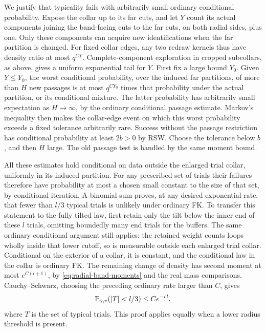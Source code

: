 We justify that typicality fails with arbitrarily small ordinary
conditional probability. Expose the collar up to its far cuts, and
let $Y$ count its actual components joining the band-facing cuts to
the far cuts, on both radial sides, plus one. Only these components
can acquire new identifications when the far partition is changed.
For fixed collar edges, any two redraw kernels thus have density
ratio at most $q^{C Y}$. Complete-component exploration in cropped
subcollars, as above, gives a uniform exponential tail for $Y$.
First fix a large bound $Y_0$. Given $Y\le Y_0$, the worst conditional
probability, over the induced far partitions, of more than $H$ new
passages is at most $q^{CY_0}$ times that probability under the
actual partition, or its conditional mixture. The latter probability
has arbitrarily small expectation as $H\to\infty$, by the ordinary
conditional passage estimate. Markov's inequality then makes the
collar-edge event on which this worst probability exceeds a fixed
tolerance arbitrarily rare. Success without the passage restriction
has conditional probability at least $2b>0$ by RSW. Choose the
tolerance below $b$, and then $H$ large. The old passage test is
handled by the same moment bound.

All these estimates hold conditional on data outside the enlarged
trial collar, uniformly in its induced partition. For any prescribed
set of trials their failures therefore have probability at most a
chosen small constant to the size of that set, by conditional
iteration. A binomial sum proves, at any desired exponential rate,
that fewer than $l/3$ typical trials is unlikely under ordinary FK.
To transfer this statement to the fully tilted law, first retain
only the tilt below the inner end of these $l$ trials, omitting
boundedly many end trials for the buffers. The same ordinary
conditional argument still applies: the retained weight counts
loops wholly inside that lower cutoff, so is measurable outside
each enlarged trial collar. Conditional on the exterior of a collar,
it is constant, and the conditional law in the collar is ordinary
FK. The remaining change of density
has second moment at most $e^{C(l+1)}$, by
\eqref{eq:radial-band-moments} and the real mass comparisons.
Cauchy--Schwarz, choosing the preceding ordinary rate larger than
$C$, gives
\begin{equation}\label{eq:radial-typical}
 \mathbb P_{\gamma,v}(|T|<l/3)\le Ce^{-cl},
\end{equation}
where $T$ is the set of typical trials. This proof applies equally
when a lower radius threshold is present.

